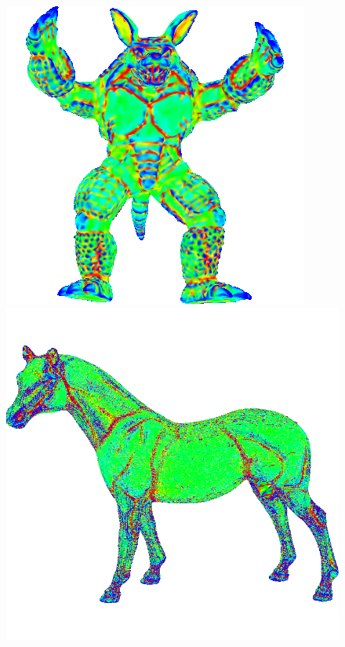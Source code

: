 \begin{figure}[!h]
    \includegraphics[scale=0.7]{images/armadillo-mcv.png}
    \endminipage\hfill
    \centering
    \includegraphics[scale=0.42]{images/horse-mce.png}
    \endminipage\hfill
    \centering
    \centering

\end{figure}
